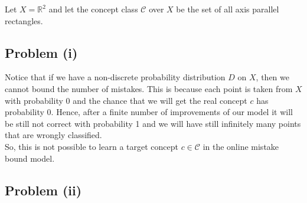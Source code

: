 Let \(X=\mathbb{R}^2\) and let the concept class \(\mathcal C\) over \(X\) be the set of all axis parallel rectangles.
\subsection*{Problem (i)}
Notice that if we have a non-discrete probability distribution \(D\) on \(X\), then we cannot bound the number of mistakes. This is because each point is taken from \(X\)  with probability 0 and the chance that we will get the real concept \(c\) has probability 0. Hence, after a finite number of improvements of our model it will be still not correct with probability 1 and we will have still infinitely many points that are wrongly classified. \\
So, this is not possible to learn a target concept \(c \in \mathcal{C}\) in the online mistake bound model.
\subsection*{Problem (ii)}